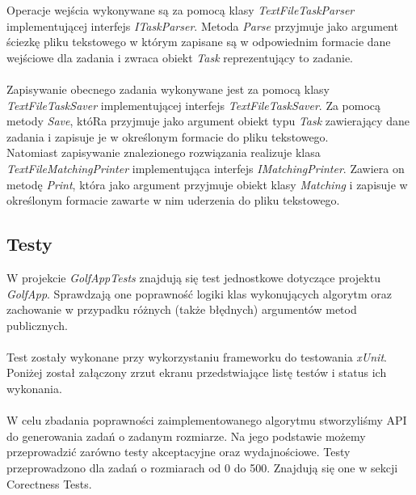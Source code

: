 \documentclass[10pt,a4paper]{article}
\begin{document}
	Operacje wejścia wykonywane są za pomocą klasy \textit{TextFileTaskParser} implementującej interfejs \textit{ITaskParser}. Metoda \textit{Parse} przyjmuje jako argument ściezkę pliku tekstowego w którym zapisane są w odpowiednim formacie dane wejściowe dla zadania i zwraca obiekt \textit{Task} reprezentujący to zadanie. \\~\\
	Zapisywanie obecnego zadania wykonywane jest za pomocą klasy \textit{TextFileTaskSaver} implementującej interfejs \textit{TextFileTaskSaver}. Za pomocą metody \textit{Save}, któRa przyjmuje jako argument obiekt typu \textit{Task} zawierający dane zadania i zapisuje je w określonym formacie do pliku tekstowego.\\
	Natomiast zapisywanie znalezionego rozwiązania realizuje klasa \textit{TextFileMatchingPrinter} implementująca interfejs \textit{IMatchingPrinter}. Zawiera on metodę \textit{Print}, która jako argument przyjmuje obiekt klasy \textit{Matching} i zapisuje w określonym formacie zawarte w nim uderzenia do pliku tekstowego.
		
	\subsection{Testy}
	
	W projekcie \textit{GolfAppTests} znajdują się test jednostkowe dotyczące projektu \textit{GolfApp}. Sprawdzają one poprawność logiki klas wykonujących algorytm oraz zachowanie w przypadku różnych (także błędnych) argumentów metod publicznych. \\~\\
	Test zostały wykonane przy wykorzystaniu frameworku do testowania \textit{xUnit}. Poniżej został załączony zrzut ekranu przedstwiające listę testów i status ich wykonania. \\~\\
	W celu zbadania poprawności zaimplementowanego algorytmu stworzyliśmy API do generowania zadań o zadanym rozmiarze. Na jego podstawie możemy przeprowadzić zarówno testy akceptacyjne oraz wydajnościowe. Testy przeprowadzono dla zadań o rozmiarach od 0 do 500. Znajdują się one w sekcji Corectness Tests. 
	
\end{document}
